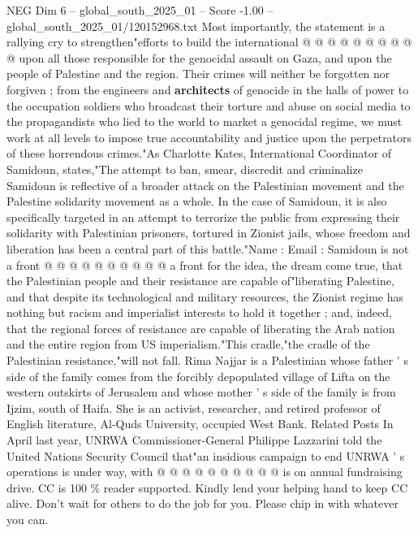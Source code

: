 \begin{textsample}{NEG Dim 6 – global\_south\_2025\_01 – Score -1.00 – global\_south\_2025\_01/120152968.txt}
Most importantly, the statement is a rallying cry to strengthen"efforts to build the international @ @ @ @ @ @ @ @ @ @ upon all those responsible for the genocidal assault on Gaza, and upon the people of Palestine and the region.
Their crimes will neither be forgotten nor forgiven ; from the engineers and \textbf{architects} of genocide in the halls of power to the occupation soldiers who broadcast their torture and abuse on social media to the propagandists who lied to the world to market a genocidal regime, we must work at all levels to impose true accountability and justice upon the perpetrators of these horrendous crimes."As Charlotte Kates, International Coordinator of Samidoun, states,"The attempt to ban, smear, discredit and criminalize Samidoun is reflective of a broader attack on the Palestinian movement and the Palestine solidarity movement as a whole.
In the case of Samidoun, it is also specifically targeted in an attempt to terrorize the public from expressing their solidarity with Palestinian prisoners, tortured in Zionist jails, whose freedom and liberation has been a central part of this battle."Name : Email : Samidoun is not a front @ @ @ @ @ @ @ @ @ @ a front for the idea, the dream come true, that the Palestinian people and their resistance are capable of"liberating Palestine, and that despite its technological and military resources, the Zionist regime has nothing but racism and imperialist interests to hold it together ; and, indeed, that the regional forces of resistance are capable of liberating the Arab nation and the entire region from US imperialism."This cradle,"the cradle of the Palestinian resistance,"will not fall.
Rima Najjar is a Palestinian whose father ' s side of the family comes from the forcibly depopulated village of Lifta on the western outskirts of Jerusalem and whose mother ' s side of the family is from Ijzim, south of Haifa.
She is an activist, researcher, and retired professor of English literature, Al-Quds University, occupied West Bank.
Related Posts In April last year, UNRWA Commissioner-General Philippe Lazzarini told the United Nations Security Council that"an insidious campaign to end UNRWA ' s operations is under way, with @ @ @ @ @ @ @ @ @ @ is on annual fundraising drive.
CC is 100 \% reader supported.
Kindly lend your helping hand to keep CC alive.
Don't wait for others to do the job for you.
Please chip in with whatever you can.

\end{textsample}

